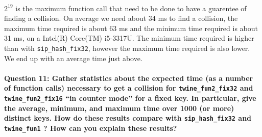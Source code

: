 \documentclass[4apaper]{report}
\begin{document}
\paragraph{} $2^{19}$ is the maximum function call that need to be done to have a guarentee of finding a collision. On average we need about 34 ms to find a collision, the maximum time required is about 63 ms and the minimum time required is about 31 ms, on a Intel(R) Core(TM) i5-3317U. The minimum time required is higher than with \texttt{sip\_hash\_fix32}, however the maximum time required is also lower. We end up with an average time just above.

\paragraph{Question 11: Gather statistics about the expected time (as a number of function calls) necessary to get a
collision for \texttt{twine\_fun2\_fix32} and \texttt{twine\_fun2\_fix16} “in counter mode” for a fixed key. In particular, give the average, minimum, and maximum time over 1000 (or more) distinct keys. How do these results compare with \texttt{sip\_hash\_fix32} and \texttt{twine\_fun1} ? How can you explain these results?}
\end{document}
